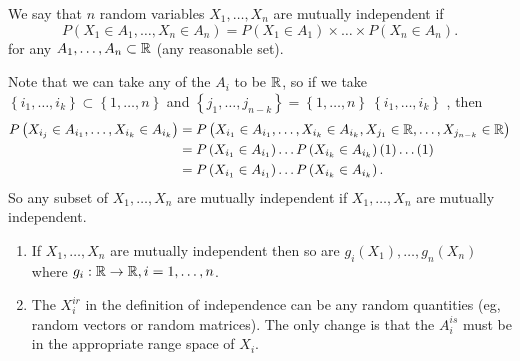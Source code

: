 
\begin{definition}
	We say that $n$ random variables $X_{1} , \ldots , X_{n}$ are mutually independent if 
	\[
		P\left( X_1 \in A_1, \ldots, X_{n} \in  A_{n} \right) = P\left( X_1 \in  A_1 \right) \times \ldots\times P\left( X_{n}\in A_{n} \right) 
	.\] 
	for any $A_{1} , \ldots , A_{n} \subset \mathbb{R}$ (any reasonable set).

	Note that we can take any of the $A_{i}$ to be $\mathbb{R}$, so if we take $\left\{ i_{1} , \ldots , i_{k} \right\} \subset \left\{ 1, \ldots , n \right\} $ and $\left\{ j_{1} , \ldots , j_{n-k} \right\}  = \left\{ 1, \ldots, n \right\}  \ \left\{ i_{1} , \ldots , i_{k} \right\} $ , then
	\begin{align*}
		P\left( X_{i_{j}} \in A_{i_{1}}, \ldots, X_{i_{k}} \in  A_{i_{k}} \right) &= P\left( X_{i_{1}} \in  A_{i_1}, \ldots, X_{i_{k}} \in A_{i_{k}}, X_{j_1} \in  \mathbb{R}, \ldots, X_{j_{n-k}} \in \mathbb{R} \right)  \\
											  &= P\left( X_{i_1} \in A_{i_1} \right) \ldots P\left( X_{i_{k}} \in  A_{i_{k}} \right) \left( 1 \right) \ldots \left( 1 \right)  \\
											  &= P\left( X_{i_1} \in A_{i_1} \right) \ldots P\left( X_{i_{k}} \in  A_{i_{k}} \right) 
	.\end{align*}
	So any subset of $X_{1} , \ldots , X_{n}$ are mutually independent if $X_{1} , \ldots , X_{n}$ are mutually independent. 
\end{definition}

\begin{remark}
	 \begin{enumerate}
		 \item If $X_{1} , \ldots , X_{n}$ are mutually independent then so are $g_{i}\left( X_1	 \right) , \ldots , g_{n}\left( X_{n} \right) $ where $g_{i} : \mathbb{R} \to \mathbb{R}, i = 1, \ldots, n$.
		 \item The $X^{ir}_{i}$ in the definition of independence can be any random quantities (eg, random vectors or random matrices). The only change is that the $A^{is}_{i}$ must be in the appropriate range space of $X_{i}$. 
	\end{enumerate}
\end{remark}

